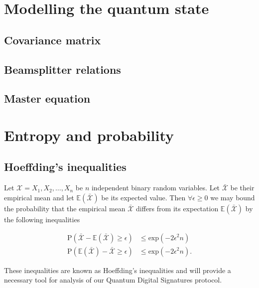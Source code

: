 \section{Modelling the quantum state}

\subsection{Covariance matrix}

\subsection{Beamsplitter relations}

\subsection{Master equation}


\section{Entropy and probability}

\subsection{Hoeffding's inequalities}
Let $\mathcal{X} = X_1, X_2, \dots, X_n$ be $n$ independent binary random variables. Let $\bar{\mathcal{X}}$ be their empirical mean  and let $\mathbb{E}\left(\bar{\mathcal{X}}\right)$ be its expected value. Then $\forall \epsilon \ge 0$ we may bound the probability that the empirical mean $\bar{\mathcal{X}}$ differs from its expectation $\mathbb{E}\left(\bar{\mathcal{X}}\right)$ by the following inequalities

\begin{align}
\label{eqn:hoeffding1}
\text{P}\left(\bar{\mathcal{X}} - \mathbb{E}\left(\bar{\mathcal{X}}\right) \ge \epsilon\right) &\le \text{exp}\left(- 2 \epsilon^2 n\right) \\
\label{eqn:hoeffding2}
\text{P}\left(\mathbb{E}\left(\bar{\mathcal{X}}\right) - \bar{\mathcal{X}} \ge \epsilon\right) &\le \text{exp}\left(- 2 \epsilon^2 n\right).
\end{align}





\noindent These inequalities are known as Hoeffding's inequalities  and will provide a necessary tool for analysis of our Quantum Digital Signatures protocol.


